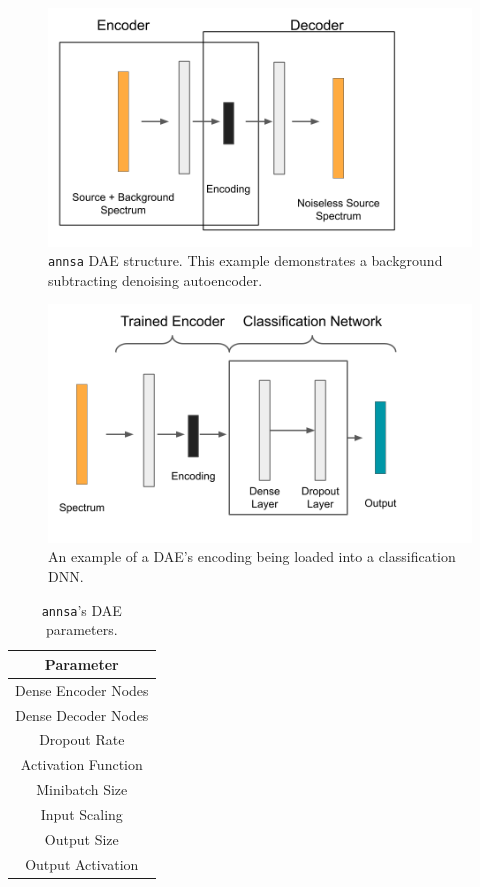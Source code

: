 \begin{figure}[H]
\centering
\includegraphics[trim=0 0 125 0,clip,width=0.8\linewidth]{images/annsa_dae.png}
\caption{\texttt{annsa} DAE structure. This example demonstrates a background subtracting denoising autoencoder.}
\label{fig:annsa_dae}
\end{figure}

\begin{figure}[H]
\centering
\includegraphics[trim=0 40 85 0,clip,width=0.8\linewidth]{images/annsa_daednn.png}
\caption{An example of a DAE's encoding being loaded into a classification DNN.}
\label{fig:annsa_daednn}
\end{figure}


\begin{table}[H]
\centering
\caption{\texttt{annsa}'s DAE parameters.}
\begin{tabular}{c}
\hline
Parameter \\ \hline
Dense Encoder Nodes \\
Dense Decoder Nodes \\
Dropout Rate \\
Activation Function \\
Minibatch Size \\ 
Input Scaling \\
Output Size \\
Output Activation \\ \hline
\end{tabular}
\label{table:annsa_dae_params}
\end{table}



